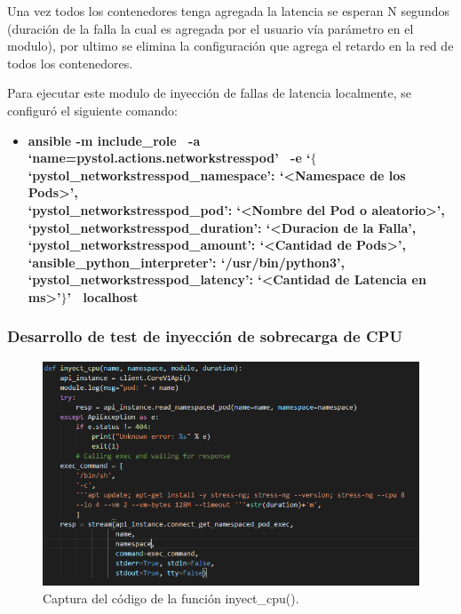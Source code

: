\par Una vez todos los contenedores tenga agregada la latencia se esperan N segundos (duración de la falla la cual es agregada por el usuario vía parámetro en el modulo), por ultimo se elimina la configuración que agrega el retardo en la red de todos los contenedores.\\ 

\par Para ejecutar este modulo de inyección de fallas de latencia localmente, se configur\'o el siguiente comando:
\begin{itemize}
    \item \textbf{ansible -m include\_role \ -a `name=pystol.actions.networkstresspod' \ -e `$\{$ \\
    `pystol\_networkstresspod\_namespace': `<Namespace de los Pods>', \\
    `pystol\_networkstresspod\_pod': `<Nombre del Pod o aleatorio>', \\
    `pystol\_networkstresspod\_duration': `<Duracion de la Falla', \\
    `pystol\_networkstresspod\_amount': `<Cantidad de Pods>', \\
    `ansible\_python\_interpreter': `/usr/bin/python3', \\
    `pystol\_networkstresspod\_latency': `<Cantidad de Latencia en ms>'$\}$' \ localhost} %
\end{itemize}

\subsubsection{Desarrollo de test de inyección de sobrecarga de CPU}

\begin{figure}[htpb!]
	\centering
	\includegraphics[width=0.95\columnwidth]{images/captures/codigo/Capture_inyect_cpu.PNG}
	\caption{Captura del código de la función inyect\_cpu().}
	\label{fig:codi03}
\end{figure}

